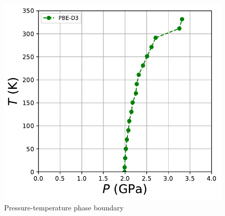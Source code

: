 \documentclass{beamer}
\begin{document}
\begin{frame}
\begin{figure}
\centering
\includegraphics[width=.70\textwidth,keepaspectratio]{./calcite_I_and_II_phase_boundary.pdf}
\vspace{-1em}
\caption{Pressure-temperature phase boundary}
\end{figure}


\end{frame}
\end{document}
